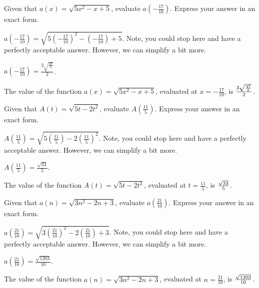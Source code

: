 \begin{shuffle}
\begin{exercise}
Given that $a(x)=\sqrt{5 x^2-x+5}$, evaluate $a\left(-\frac{17}{10}\right)$. Express your answer in an exact form.
\begin{solution}
\begin{hint}
$a\left(-\frac{17}{10}\right)=\sqrt{5 (-\frac{17}{10})^2-(-\frac{17}{10})+5}$. Note, you could stop here and have a perfectly acceptable answer. However, we can simplify a bit more. 
\end{hint}
\begin{hint}
$a\left(-\frac{17}{10}\right)=\frac{3 \sqrt{\frac{47}{5}}}{2}$.
\end{hint}
The value of the function $a(x)=\sqrt{5 x^2-x+5}$, evaluated at $x=-\frac{17}{10}$, is ${\frac{3 \sqrt{\frac{47}{5}}}{2}}$.
\end{solution}
\end{exercise}

\begin{exercise}
Given that $A(t)=\sqrt{5 t-2 t^2}$, evaluate $A\left(\frac{11}{5}\right)$. Express your answer in an exact form.
\begin{solution}
\begin{hint}
$A\left(\frac{11}{5}\right)=\sqrt{5 (\frac{11}{5})-2 (\frac{11}{5})^2}$. Note, you could stop here and have a perfectly acceptable answer. However, we can simplify a bit more. 
\end{hint}
\begin{hint}
$A\left(\frac{11}{5}\right)=\frac{\sqrt{33}}{5}$.
\end{hint}
The value of the function $A(t)=\sqrt{5 t-2 t^2}$, evaluated at $t=\frac{11}{5}$, is ${\frac{\sqrt{33}}{5}}$.
\end{solution}
\end{exercise}

\begin{exercise}
Given that $a(n)=\sqrt{3 n^2-2 n+3}$, evaluate $a\left(\frac{21}{10}\right)$. Express your answer in an exact form.
\begin{solution}
\begin{hint}
$a\left(\frac{21}{10}\right)=\sqrt{3 (\frac{21}{10})^2-2 (\frac{21}{10})+3}$. Note, you could stop here and have a perfectly acceptable answer. However, we can simplify a bit more. 
\end{hint}
\begin{hint}
$a\left(\frac{21}{10}\right)=\frac{\sqrt{1203}}{10}$.
\end{hint}
The value of the function $a(n)=\sqrt{3 n^2-2 n+3}$, evaluated at $n=\frac{21}{10}$, is ${\frac{\sqrt{1203}}{10}}$.
\end{solution}
\end{exercise}


\end{shuffle}
